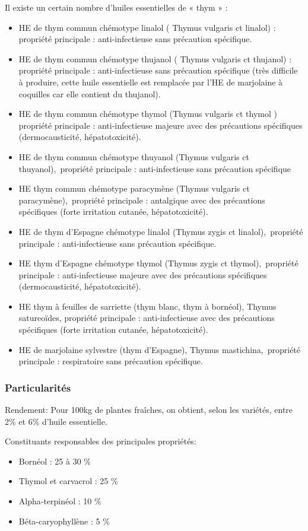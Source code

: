 \documentclass[12pt,a4wide]{article}
\begin{document}
Il existe un certain nombre d'huiles essentielles de « thym » :
\begin{itemize}
\item HE de thym commun chémotype linalol ( Thymus vulgaris ct linalol) : propriété principale : anti-infectieuse sans précaution spécifique.
\item HE de thym commun chémotype thujanol ( Thymus vulgaris ct thujanol) : propriété principale : anti-infectieuse sans précaution spécifique (très difficile à produire, cette huile essentielle est remplacée par l'HE de marjolaine à coquilles car elle contient du thujanol).
\item HE de thym commun chémotype thymol (Thymus vulgaris ct thymol ) propriété principale : anti-infectieuse majeure avec des précautions spécifiques (dermocausticité, hépatotoxicité).
\item HE de thym commun chémotype thuyanol (Thymus vulgaris ct thuyanol), propriété principale : anti-infectieuse sans précaution spécifique
\item HE thym commun chémotype paracymène (Thymus vulgaris ct paracymène), propriété principale : antalgique avec des précautions spécifiques (forte irritation cutanée, hépatotoxicité).
\item HE de thym d'Espagne chémotype linalol (Thymus zygis ct linalol), propriété principale : anti-infectieuse sans précaution spécifique.
\item HE thym d'Espagne chémotype thymol (Thymus zygis ct thymol), propriété principale : anti-infectieuse majeure avec des précautions spécifiques (dermocausticité, hépatotoxicité).
\item HE thym à feuilles de sarriette (thym blanc, thym à bornéol), Thymus satureoïdes, propriété principale : anti-infectieuse avec des précautions spécifiques (forte irritation cutanée, hépatotoxicité).
\item HE de marjolaine sylvestre (thym d'Espagne), Thymus mastichina, propriété principale : respiratoire sans précaution spécifique.
\end{itemize}


\subsubsection{Particularités}
\label{sec-4-10-3}

Rendement: Pour 100kg de plantes fraîches, on obtient, selon les variétés, entre 2\% et 6\% d'huile essentielle.

Constituants responsables des principales propriétés:
\begin{itemize}
\item Bornéol : 25 à 30 \%
\item Thymol et carvacrol : 25 \%
\item Alpha-terpinéol : 10 \%
\item Béta-caryophyllène : 5 \%
\end{itemize}
\end{document}
